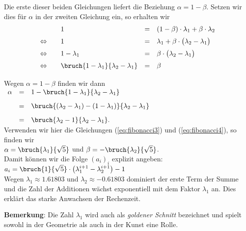Die erste dieser beiden Gleichungen liefert die Beziehung $\alpha = 1 - \beta$.  Setzen
wir dies f\"{u}r $\alpha$ in der zweiten Gleichung ein, so erhalten wir 
\[
\begin{array}{clcl}
                      &  1 & = & (1 - \beta)\cdot  \lambda_1 + \beta \cdot \lambda_2 \\[0.2cm]
\Leftrightarrow\quad  &  1 & = & 
 \lambda_1  + \beta \cdot \bigl( \lambda_2 - \lambda_1\bigr) \\[0.2cm]
\Leftrightarrow\quad  &  1 - \lambda_1 & = & \beta \cdot \bigl(\lambda_2 - \lambda_1\bigr)  \\[0.2cm]
\Leftrightarrow\quad  &  \bruch{1 - \lambda_1}{\lambda_2 - \lambda_1} & = & \beta \\[0.2cm]
\end{array}
\]
Wegen $\alpha = 1 - \beta$ finden wir dann \\[0.2cm]
\hspace*{1.3cm} 
$
\begin{array}[t]{lcl}
\alpha & = & 1 - \bruch{1 - \lambda_1}{\lambda_2 - \lambda_1} \\[0.3cm]
       & = & \bruch{(\lambda_2 - \lambda_1) -(1 - \lambda_1)}{\lambda_2 - \lambda_1} \\[0.3cm]
       & = & \bruch{\lambda_2 - 1}{\lambda_2 - \lambda_1}.
\end{array}
$
\\[0.2cm]
Verwenden  wir hier die Gleichungen (\ref{eq:fibonacci3}) und (\ref{eq:fibonacci4}), so
finden wir \\[0.2cm] 
\hspace*{1.3cm} 
$\alpha = \bruch{\lambda_1}{\sqrt{5}} $ \quad und \quad $\beta  = -\bruch{\lambda_2}{\sqrt{5}}$. \\[0.2cm]
Damit k\"{o}nnen wir die Folge $(a_i)_i$ explizit angeben: \\[0.2cm]
\hspace*{1.3cm} 
$\displaystyle 
   a_i = \bruch{1}{\sqrt{5}} \cdot \left( \lambda_1^{i+1} - \lambda_2^{i+1} \right) - 1$ \\[0.2cm]
Wegen $\lambda_1\approx 1.61803$ und $\lambda_2 \approx - 0.61803$ dominiert der erste Term
der Summe und die Zahl der Additionen w\"{a}chst exponentiell mit dem Faktor $\lambda_1$ an.
Dies erkl\"{a}rt das starke Anwachsen der Rechenzeit.
\vspace*{0.3cm}

\noindent
\textbf{Bemerkung}:  Die Zahl $\lambda_1$ wird auch als \emph{goldener Schnitt} bezeichnet
und spielt sowohl in der Geometrie als auch in der Kunst eine Rolle.
\vspace*{0.3cm}


